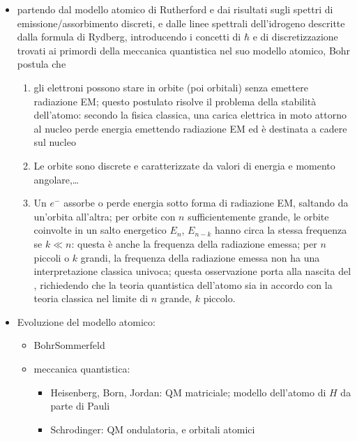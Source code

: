 \documentclass[letterpaper,10pt,italian]{jupyterBook}
\begin{document}
\label{\detokenize{ch/modern/intro-radioactivity:n-bohr}}\begin{itemize}
\item {} 
\sphinxAtStartPar
partendo dal modello atomico di Rutherford e dai risultati sugli spettri di emissione/assorbimento discreti, e dalle linee spettrali dell’idrogeno descritte dalla formula di Rydberg, introducendo i concetti di \(\hbar\) e di discretizzazione trovati ai primordi della meccanica quantistica nel suo modello atomico, Bohr postula che
\begin{enumerate}
%
\item {} 
\sphinxAtStartPar
gli elettroni possono stare in orbite (poi orbitali) senza emettere radiazione EM; questo postulato risolve il problema della stabilità dell’atomo: secondo la fisica classica, una carica elettrica in moto attorno al nucleo perde energia emettendo radiazione EM ed è destinata a cadere sul nucleo

\item {} 
\sphinxAtStartPar
Le orbite sono discrete e caratterizzate da valori di energia e momento angolare,…

\item {} 
\sphinxAtStartPar
Un \(e^-\) assorbe o perde energia sotto forma di radiazione EM, saltando da un’orbita all’altra; per orbite con \(n\) sufficientemente grande, le orbite coinvolte in un salto energetico \(E_{n}\), \(E_{n-k}\) hanno circa la stessa frequenza se \(k \ll n\): questa è anche la frequenza della radiazione emessa; per \(n\) piccoli o \(k\) grandi, la frequenza della radiazione emessa non ha una interpretazione classica univoca; questa osservazione porta alla nascita del , richiedendo che la teoria quantistica dell’atomo sia in accordo con la teoria classica nel limite di \(n\) grande, \(k\) piccolo.

\end{enumerate}

\item {} 
\sphinxAtStartPar
Evoluzione del modello atomico:
\begin{itemize}
\item {} 
\sphinxAtStartPar
Bohr\sphinxhyphen{}Sommerfeld

\item {} 
\sphinxAtStartPar
meccanica quantistica:
\begin{itemize}
\item {} 
\sphinxAtStartPar
Heisenberg, Born, Jordan: QM matriciale; modello dell’atomo di \(H\) da parte di Pauli

\item {} 
\sphinxAtStartPar
Schrodinger: QM ondulatoria, e orbitali atomici

\end{itemize}

\end{itemize}

\end{itemize}
\end{document}
